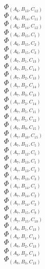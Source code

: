 \documentclass[14pt]{article}
\begin{document}
    $\Phi_{({A}_{6}, {B}_{13}, {C}_{12})}$ \\ 
    $\Phi_{({A}_{6}, {B}_{14}, {C}_{11})}$ \\ 
    $\Phi_{({A}_{6}, {B}_{14}, {C}_{12})}$ \\ 
    $\Phi_{({A}_{6}, {B}_{15}, {C}_{1})}$ \\ 
    $\Phi_{({A}_{6}, {B}_{15}, {C}_{2})}$ \\ 
    $\Phi_{({A}_{6}, {B}_{15}, {C}_{3})}$ \\ 
    $\Phi_{({A}_{7}, {B}_{1}, {C}_{13})}$ \\ 
    $\Phi_{({A}_{7}, {B}_{1}, {C}_{14})}$ \\ 
    $\Phi_{({A}_{7}, {B}_{2}, {C}_{13})}$ \\ 
    $\Phi_{({A}_{7}, {B}_{2}, {C}_{14})}$ \\ 
    $\Phi_{({A}_{7}, {B}_{3}, {C}_{13})}$ \\ 
    $\Phi_{({A}_{7}, {B}_{3}, {C}_{14})}$ \\ 
    $\Phi_{({A}_{7}, {B}_{5}, {C}_{11})}$ \\ 
    $\Phi_{({A}_{7}, {B}_{5}, {C}_{12})}$ \\ 
    $\Phi_{({A}_{7}, {B}_{9}, {C}_{15})}$ \\ 
    $\Phi_{({A}_{7}, {B}_{10}, {C}_{15})}$ \\ 
    $\Phi_{({A}_{7}, {B}_{11}, {C}_{5})}$ \\ 
    $\Phi_{({A}_{7}, {B}_{12}, {C}_{5})}$ \\ 
    $\Phi_{({A}_{7}, {B}_{13}, {C}_{1})}$ \\ 
    $\Phi_{({A}_{7}, {B}_{13}, {C}_{2})}$ \\ 
    $\Phi_{({A}_{7}, {B}_{13}, {C}_{3})}$ \\ 
    $\Phi_{({A}_{7}, {B}_{14}, {C}_{1})}$ \\ 
    $\Phi_{({A}_{7}, {B}_{14}, {C}_{2})}$ \\ 
    $\Phi_{({A}_{7}, {B}_{14}, {C}_{3})}$ \\ 
    $\Phi_{({A}_{7}, {B}_{15}, {C}_{9})}$ \\ 
    $\Phi_{({A}_{7}, {B}_{15}, {C}_{10})}$ \\ 
    $\Phi_{({A}_{8}, {B}_{1}, {C}_{13})}$ \\ 
    $\Phi_{({A}_{8}, {B}_{1}, {C}_{14})}$ \\ 
    $\Phi_{({A}_{8}, {B}_{2}, {C}_{13})}$ \\ 
    $\Phi_{({A}_{8}, {B}_{2}, {C}_{14})}$ \\ 
    $\Phi_{({A}_{8}, {B}_{3}, {C}_{13})}$ \\ 
\end{document}
